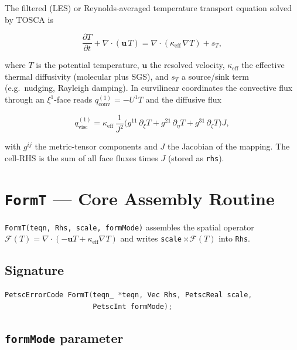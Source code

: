 \documentclass[12pt,a4paper]{article}
\begin{document}
The filtered (LES) or Reynolds-averaged temperature transport equation solved by TOSCA is

\begin{equation}
  \frac{\partial T}{\partial t}
  + \nabla\!\cdot\!(\mathbf{u}\,T)
  = \nabla\!\cdot\!(\kappa_{\text{eff}}\,\nabla T)
  + s_T,
  \label{eq:teqn}
\end{equation}

where $T$ is the potential temperature, $\mathbf{u}$ the resolved velocity,
$\kappa_{\text{eff}}$ the effective thermal diffusivity (molecular plus SGS), and
$s_T$ a source/sink term (e.g.\ nudging, Rayleigh damping).
In curvilinear coordinates the convective flux through an $\xi^1$-face reads
$q_{\text{conv}}^{(1)} = -U^1 T$
and the diffusive flux

\begin{equation}
  q_{\text{visc}}^{(1)}
  = \kappa_{\text{eff}}\,\frac{1}{J^2}
    \bigl(g^{11}\,\partial_\xi T
         + g^{21}\,\partial_\eta T
         + g^{31}\,\partial_\zeta T\bigr)
    J,
\end{equation}

with $g^{ij}$ the metric-tensor components and $J$ the Jacobian of the mapping.
The cell-RHS is the sum of all face fluxes times $J$ (stored as \texttt{rhs}).

\section{\texttt{FormT} — Core Assembly Routine}
\label{sec:formT}

\texttt{FormT(teqn, Rhs, scale, formMode)} assembles the spatial operator
$\mathcal{F}(T) = \nabla\!\cdot\!(-\mathbf{u}T + \kappa_{\text{eff}}\nabla T)$
and writes \texttt{scale}\,$\times \mathcal{F}(T)$ into \texttt{Rhs}.

\subsection*{Signature}

\begin{lstlisting}[language=C,basicstyle=\ttfamily\small]
PetscErrorCode FormT(teqn_ *teqn, Vec Rhs, PetscReal scale,
                     PetscInt formMode);
\end{lstlisting}

\subsection*{\texttt{formMode} parameter}
\end{document}
